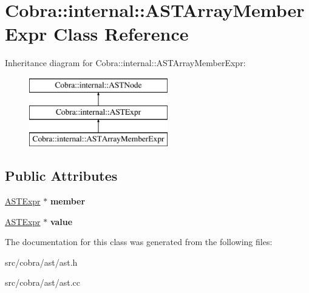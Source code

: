\hypertarget{class_cobra_1_1internal_1_1_a_s_t_array_member_expr}{\section{Cobra\+:\+:internal\+:\+:A\+S\+T\+Array\+Member\+Expr Class Reference}
\label{class_cobra_1_1internal_1_1_a_s_t_array_member_expr}
}
Inheritance diagram for Cobra\+:\+:internal\+:\+:A\+S\+T\+Array\+Member\+Expr\+:\begin{figure}[H]
\begin{center}
\leavevmode
\includegraphics[height=3.000000cm]{class_cobra_1_1internal_1_1_a_s_t_array_member_expr}
\end{center}
\end{figure}
\subsection*{Public Attributes}
\begin{DoxyCompactItemize}
\item 
\hypertarget{class_cobra_1_1internal_1_1_a_s_t_array_member_expr_a922f6f629046bbc5bdf5b6cc7995855a}{\hyperlink{class_cobra_1_1internal_1_1_a_s_t_expr}{A\+S\+T\+Expr} $\ast$ {\bfseries member}}\label{class_cobra_1_1internal_1_1_a_s_t_array_member_expr_a922f6f629046bbc5bdf5b6cc7995855a}

\item 
\hypertarget{class_cobra_1_1internal_1_1_a_s_t_array_member_expr_a082fbdf58b2a807931a81fda004b86f7}{\hyperlink{class_cobra_1_1internal_1_1_a_s_t_expr}{A\+S\+T\+Expr} $\ast$ {\bfseries value}}\label{class_cobra_1_1internal_1_1_a_s_t_array_member_expr_a082fbdf58b2a807931a81fda004b86f7}

\end{DoxyCompactItemize}


The documentation for this class was generated from the following files\+:\begin{DoxyCompactItemize}
\item 
src/cobra/ast/ast.\+h\item 
src/cobra/ast/ast.\+cc\end{DoxyCompactItemize}
